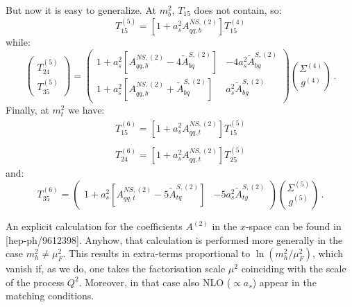 \documentclass[10pt,a4paper]{article}
\begin{document}
But now it is easy to generalize. At $m_b^2$, $T_{15}$ does not
contain, so:
\begin{equation}
T_{15}^{(5)}=[1+a_s^2A_{qq,b}^{N\!S,(2)}]T_{15}^{(4)}
\label{pippo2}
\end{equation}
while:
\begin{equation}
\begin{pmatrix} T_{24}^{(5)} \\ T_{35}^{(5)} \end{pmatrix} = \begin{pmatrix}  1+a_s^2[A_{qq,b}^{N\!S,(2)}-4\tilde{A}^{S,(2)}_{bq}] & -4a_s^2\tilde{A}^{S,(2)}_{bg}\\  
1+a_s^2[A_{qq,b}^{N\!S,(2)}+\tilde{A}^{S,(2)}_{bq}] &
a_s^2\tilde{A}^{S,(2)}_{bg} \end{pmatrix}{\Sigma^{(4)} \choose
g^{(4)}}\,.
\label{pippo3}
\end{equation}
Finally, at $m_t^2$ we have:
\begin{equation}
\begin{array}{l}
\displaystyle T_{15}^{(6)}=[1+a_s^2A_{qq,t}^{N\!S,(2)}]T_{15}^{(5)}\\
\\
\displaystyle T_{24}^{(6)}=[1+a_s^2A_{qq,t}^{N\!S,(2)}]T_{25}^{(5)}
\end{array}
\label{pippo4}
\end{equation}
and:
\begin{equation}
T_{35}^{(6)} = \begin{pmatrix}
  1+a_s^2[A_{qq,t}^{N\!S,(2)}-5\tilde{A}^{S,(2)}_{tq}] &
  -5a_s^2\tilde{A}^{S,(2)}_{tg}\end{pmatrix}{\Sigma^{(5)} \choose
  g^{(5)}}\,.
\label{pippo5}
\end{equation}

An explicit calculation for the coefficients $A^{(2)}$ in the
$x$-space can be found in [hep-ph/9612398]. Anyhow, that calculation
is performed more generally in the case $m_h^2\neq\mu_F^2$. This
results in extra-terms proportional to $\ln(m_h^2/\mu_F^2)$, which
vanish if, as we do, one takes the factorisation scale $\mu^2$
coinciding with the scale of the process $Q^2$. Moreover, in that case
also NLO ($\propto a_s$) appear in the matching conditions.
\end{document}
